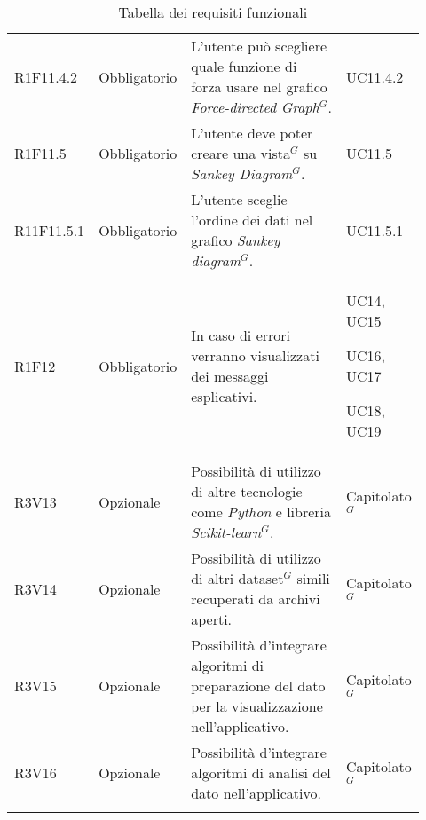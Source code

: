 {\begin{longtable}{p{0.12\linewidth}p{0.15\linewidth}p{0.50\linewidth}p{0.15\linewidth}}
    R1F11.4.2 & Obbligatorio & L'utente può scegliere quale funzione di forza usare nel grafico \textit{Force-directed Graph$^{G}$}. & UC11.4.2\\
    \rowcolor[RGB]{233, 245, 206}
    R1F11.5 & Obbligatorio & L'utente deve poter creare una vista$^{G}$ su \textit{Sankey Diagram$^{G}$}. & UC11.5\\
    \rowcolor[RGB]{216, 235, 171}
    R11F11.5.1 & Obbligatorio & L'utente sceglie l'ordine dei dati nel grafico \textit{Sankey diagram$^{G}$}. & UC11.5.1\\
    \rowcolor[RGB]{233, 245, 206}
    R1F12 & Obbligatorio & In caso di errori verranno visualizzati dei messaggi esplicativi. & UC14, UC15 \par UC16, UC17 \par UC18, UC19\\
    \rowcolor[RGB]{216, 235, 171}
    R3V13 & Opzionale & Possibilità di utilizzo di altre tecnologie come \textit{Python} e libreria \textit{Scikit-learn}$^{G}$.& Capitolato$^{G}$\\
    \rowcolor[RGB]{233, 245, 206}
    R3V14 & Opzionale & Possibilità di utilizzo di altri dataset$^{G}$ simili recuperati da archivi aperti. & Capitolato$^{G}$ \\
    \rowcolor[RGB]{216, 235, 171}
    R3V15 & Opzionale & Possibilità d'integrare algoritmi di preparazione del dato per la visualizzazione nell'applicativo. & Capitolato$^{G}$\\
    \rowcolor[RGB]{233, 245, 206}
    R3V16 & Opzionale & Possibilità d'integrare algoritmi di analisi del dato nell'applicativo. & Capitolato$^{G}$\\
    \caption{Tabella dei requisiti funzionali}

\end{longtable}
}


